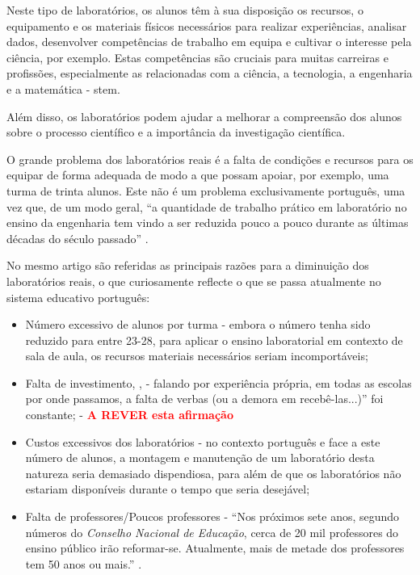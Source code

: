 Neste tipo de laboratórios, os alunos têm à sua disposição os recursos, o equipamento e os materiais físicos necessários para realizar experiências, analisar dados, desenvolver competências de trabalho em equipa e cultivar o interesse pela ciência, por exemplo. Estas competências são cruciais para muitas carreiras e profissões, especialmente as relacionadas com a ciência, a tecnologia, a engenharia e a matemática - \acrshort{stem}.

Além disso, os laboratórios podem ajudar a melhorar a compreensão dos alunos sobre o processo científico e a importância da investigação científica.

O grande problema dos laboratórios reais é a falta de condições e recursos para os equipar de forma adequada de modo a que possam apoiar, por exemplo, uma turma de trinta alunos. Este não é um problema exclusivamente português, uma vez que, de um modo geral, ``a quantidade de trabalho prático em laboratório no ensino da engenharia tem vindo a ser reduzida pouco a pouco durante as últimas décadas do século passado'' \cite{PaperTit40:online}.

No mesmo artigo \cite{PaperTit40:online} são referidas as principais razões para a diminuição dos laboratórios reais, o que curiosamente reflecte o que se passa atualmente no sistema educativo português: 

\begin{itemize}
 \item Número excessivo de alunos por turma \cite{Reduçãod55:online} - embora o número tenha sido reduzido para entre 23-28, para aplicar o ensino laboratorial em contexto de sala de aula, os recursos materiais necessários seriam incomportáveis;
    \item Falta de investimento\cite{Faltadei99:online}, \cite{Odesinve56:online}, \cite{EDUSTATP20:online} - falando por experiência própria, em todas as escolas por onde passamos, a falta de verbas (ou a demora em recebê-las...)'' foi constante; - \textcolor{red}{\textbf{A REVER esta afirmação}}
    \item Custos excessivos dos laboratórios - no contexto português e face a este número de alunos, a montagem e manutenção de um laboratório desta natureza seria demasiado dispendiosa, para além de que os laboratórios não estariam disponíveis durante o tempo que seria desejável;
    \item Falta de professores/Poucos professores - ``Nos próximos sete anos, segundo números do \textit{Conselho Nacional de Educação}, cerca de 20 mil professores do ensino público irão reformar-se. Atualmente, mais de metade dos professores tem 50 anos ou mais.'' \cite{Faltaded39:online}.
\end{itemize}

